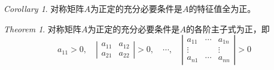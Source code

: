 \documentclass[UTF8]{ctexart}
\theoremstyle{remark}
\newtheorem{theorem}{Theorem}
\newtheorem{corollary}{Corollary}
\begin{document}
\begin{enumerate}
\begin{enumerate}
		\begin{corollary}
			对称矩阵$A$为正定的充分必要条件是$A$的特征值全为正。
		\end{corollary}
		
		\begin{theorem}
			对称矩阵$A$为正定的充分必要条件是$A$的各阶主子式为正，即
			\[
			a_{11}>0,\quad
			\left|\begin{array}{ll}a_{11}&a_{12}\\a_{21}&a_{22}\end{array}\right|>0,\quad
			\cdots,\quad
			\left|\begin{array}{ccc}a_{11}&\cdots&a_{1n}\\\vdots&&\vdots\\a_{n1}&\cdots&a_{nn}\end{array}\right|>0
			\]
		\end{theorem}
	\end{enumerate}
	
	\end{enumerate}
\end{document}
